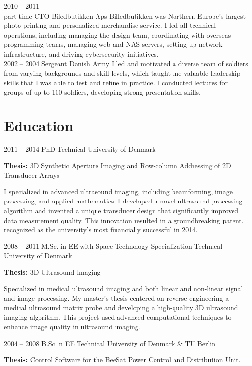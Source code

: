 \documentclass[8pt]{mofiicv}
\begin{document}
\begin{minipage}[T]{\SecondColumnWidth}
\begin{entrylist}
		\entry
			{2010 -- 2011\\\footnotesize{part time}}
			{CTO}
			{Biledbutikken Aps}
			{
			Billedbutikken was Northern Europe's largest photo printing and personalized merchandise service. I led all technical operations, including managing the design team, coordinating with overseas programming teams, managing web and NAS servers, setting up network infrastructure, and driving cybersecurity initiatives.\\
			}
		\entry
			{2002 -- 2004}
			{Sergeant}
			{Danish Army}
			{
			I led and motivated a diverse team of soldiers from varying backgrounds and skill levels, which taught me valuable leadership skills that I was able to test and refine in practice. I conducted lectures for groups of up to 100 soldiers, developing strong presentation skills.\\ 
			}
	\end{entrylist}

	\section{Education}
	\begin{entrylist}
		\entry
			{2011 -- 2014}
			{PhD}
			{Technical University of Denmark}
			{\textbf{Thesis:} 3D Synthetic Aperture Imaging and Row-column Addressing of 2D Transducer Arrays

			I specialized in advanced ultrasound imaging, including beamforming, image processing, and applied mathematics. I developed a novel ultrasound processing algorithm and invented a unique transducer design that significantly improved data measurement quality. This innovation resulted in a groundbreaking patent, recognized as the university's most financially successful in 2014.}
		\entry
			{2008 -- 2011}
			{M.Sc. in EE with Space Technology Specialization}
			{Technical University of Denmark}
			{\textbf{Thesis:} 3D Ultrasound Imaging

			Specialized in medical ultrasound imaging and both linear and non-linear signal and image processing. My master's thesis centered on reverse engineering a medical ultrasound matrix probe and developing a high-quality 3D ultrasound imaging algorithm. 
			This project used advanced computational techniques to enhance image quality in ultrasound imaging.}
		\entry
			{2004 -- 2008}
			{B.Sc in EE}
			{Technical University of Denmark \& TU Berlin} 
			{\textbf{Thesis:} Control Software for the BeeSat Power Control and Distribution Unit.

}
\end{entrylist}
\end{minipage}
\end{document}

